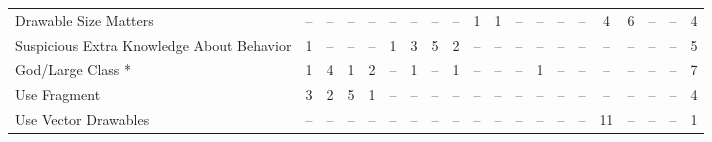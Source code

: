 \begin{table*}[t]
\begin{tabular}{@{}p{4cm}|p{.2cm}p{.2cm}p{.2cm}p{.2cm}p{.2cm}p{.2cm}p{.2cm}p{.2cm}p{.2cm}p{.4cm}p{.4cm}p{.4cm}p{.4cm}p{.4cm}p{.4cm}p{.4cm}p{.4cm}p{.4cm}|p{1.5cm}@{}}
Drawable Size Matters						& \multicolumn{1}{c}{--}		& \multicolumn{1}{c}{--}		& \multicolumn{1}{c}{--}	& \multicolumn{1}{c}{--}	& \multicolumn{1}{c}{--}	& \multicolumn{1}{c}{--}	& \multicolumn{1}{c}{--}	& \multicolumn{1}{c}{--}	& \multicolumn{1}{c}{1}	& \multicolumn{1}{c}{1}	& \multicolumn{1}{c}{--}	& \multicolumn{1}{c}{--}	& \multicolumn{1}{c}{--}	& \multicolumn{1}{c}{--}	& \multicolumn{1}{c}{4}	& \multicolumn{1}{c}{6}	& \multicolumn{1}{c}{--}	& \multicolumn{1}{c}{--} 		& \multicolumn{1}{|c}{4} \\
Suspicious Extra Knowledge About Behavior	& \multicolumn{1}{c}{1}		& \multicolumn{1}{c}{--}		& \multicolumn{1}{c}{--}	& \multicolumn{1}{c}{--}	& \multicolumn{1}{c}{1}	& \multicolumn{1}{c}{3}	& \multicolumn{1}{c}{5}	& \multicolumn{1}{c}{2}	& \multicolumn{1}{c}{--}	& \multicolumn{1}{c}{--}	& \multicolumn{1}{c}{--}	& \multicolumn{1}{c}{--}	& \multicolumn{1}{c}{--}	& \multicolumn{1}{c}{--}	& \multicolumn{1}{c}{--}	& \multicolumn{1}{c}{--}	& \multicolumn{1}{c}{--}	& \multicolumn{1}{c}{--} 		& \multicolumn{1}{|c}{5} \\
God/Large Class *							& \multicolumn{1}{c}{1}		& \multicolumn{1}{c}{4}		& \multicolumn{1}{c}{1}	& \multicolumn{1}{c}{2}	& \multicolumn{1}{c}{--}	& \multicolumn{1}{c}{1}	& \multicolumn{1}{c}{--}	& \multicolumn{1}{c}{1}	& \multicolumn{1}{c}{--}	& \multicolumn{1}{c}{--}	& \multicolumn{1}{c}{--}	& \multicolumn{1}{c}{1}	& \multicolumn{1}{c}{--}	& \multicolumn{1}{c}{--}	& \multicolumn{1}{c}{--}	& \multicolumn{1}{c}{--}	& \multicolumn{1}{c}{--}	& \multicolumn{1}{c}{--} 		& \multicolumn{1}{|c}{7} \\
Use Fragment								& \multicolumn{1}{c}{3}		& \multicolumn{1}{c}{2}		& \multicolumn{1}{c}{5}	& \multicolumn{1}{c}{1}	& \multicolumn{1}{c}{--}	& \multicolumn{1}{c}{--}	& \multicolumn{1}{c}{--}	& \multicolumn{1}{c}{--}	& \multicolumn{1}{c}{--}	& \multicolumn{1}{c}{--}	& \multicolumn{1}{c}{--}	& \multicolumn{1}{c}{--}	& \multicolumn{1}{c}{--}	& \multicolumn{1}{c}{--}	& \multicolumn{1}{c}{--}	& \multicolumn{1}{c}{--}	& \multicolumn{1}{c}{--}	& \multicolumn{1}{c}{--} 		& \multicolumn{1}{|c}{4} \\
Use Vector Drawables						& \multicolumn{1}{c}{--}		& \multicolumn{1}{c}{--}		& \multicolumn{1}{c}{--}	& \multicolumn{1}{c}{--}	& \multicolumn{1}{c}{--}	& \multicolumn{1}{c}{--}	& \multicolumn{1}{c}{--}	& \multicolumn{1}{c}{--}	& \multicolumn{1}{c}{--}	& \multicolumn{1}{c}{--}	& \multicolumn{1}{c}{--}	& \multicolumn{1}{c}{--}	& \multicolumn{1}{c}{--}	& \multicolumn{1}{c}{--}	& \multicolumn{1}{c}{11}	& \multicolumn{1}{c}{--}	& \multicolumn{1}{c}{--}	& \multicolumn{1}{c}{--} 	& \multicolumn{1}{|c}{1} \\

\end{tabular}
\end{table*}
